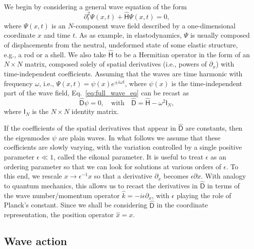 We begin by considering a general wave equation of the form
%
\begin{equation}
  \partial_{t}^{2}\Psi(x,t) + \widehat{\mathsf{H}}\Psi(x,t) = 0,
  \label{eq:full_wave_eq}
\end{equation}
%
where $\Psi(x,t)$ is an $N$-component wave field described by a one-dimensional coordinate $x$ and time $t$.
As as example, in elastodynamics, $\Psi$ is usually composed of displacements from the neutral, undeformed state of some elastic structure, e.g., a rod or a shell.
We also take $\widehat{\mathsf{H}}$ to be a Hermitian operator in the form of an $N\times N$ matrix, composed solely of spatial derivatives (i.e., powers of $\partial_{x}$) with time-independent coefficients.
Assuming that the waves are time harmonic with frequency $\omega$, i.e., $\Psi(x, t) = \psi(x)e^{\pm i\omega t}$, where $\psi(x)$ is the time-independent part of the wave field, Eq.~\eqref{eq:full_wave_eq} can be recast as
%
\begin{equation}
  \widehat{\mathsf{D}}\psi = 0,\quad \text{with}\quad \widehat{\mathsf{D}} = \widehat{\mathsf{H}} - \omega^{2}\mathsf{I}_{N},
  \label{eq:ev_problem}
\end{equation}
%
where $\mathsf{I}_{N}$ is the $N\times N$ identity matrix.

If the coefficients of the spatial derivatives that appear in $\widehat{\mathsf{D}}$ are constants, then the eigenmodes $\psi$ are plain waves.
In what follows we assume that these coefficients are slowly varying, with the variation controlled by a single positive parameter $\epsilon \ll 1$, called the eikonal parameter.
It is useful to treat $\epsilon$ as an ordering parameter so that we can look for solutions at various orders of $\epsilon$.
To this end, we rescale $x \to \epsilon^{-1}x$ so that a derivative $\partial_{x}$ becomes $\epsilon \partial x$.
With analogy to quantum mechanics, this allows us to recast the derivatives in $\widehat{\mathsf{D}}$ in terms of the wave number/momentum operator $\hat{k} = -i\epsilon \partial_{x}$, with $\epsilon$ playing the role of Planck's constant.
Since we shall be considering $\widehat{\mathsf{D}}$ in the coordinate representation, the position operator $\hat{x} = x$.

\subsection{Wave action}

